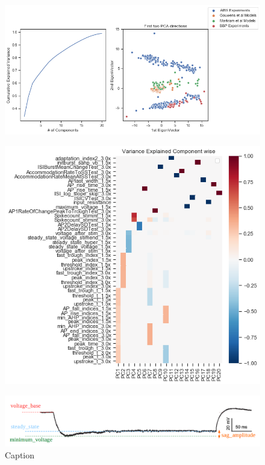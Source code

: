 \begin{figure}    
\begin{center} \includegraphics[width=1.0\linewidth]{figures/cortical_model_data_agreement_52_1}
    \caption{}
    \label{fig:}
\end{center}
\end{figure}    
\begin{figure}    
    \begin{center}
    \includegraphics[width=1.0\linewidth]{figures/cortical_model_data_agreement_54_1.png}
    \caption{}
    \end{center}
\end{figure}    
\cite{wang2019sag}

\begin{figure}
    \centering
    \includegraphics{figures/sag_amplitude}
    \caption{Caption}
    \label{fig:sag_amplitude}
\end{figure}

